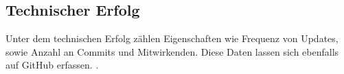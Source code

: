 \subsection{Technischer Erfolg}

Unter dem technischen Erfolg zählen Eigenschaften wie Frequenz von Updates,
sowie Anzahl an Commits und Mitwirkenden. Diese Daten lassen sich ebenfalls auf GitHub erfassen.
\cite{midhaFactorsAffectingSuccess2012}. %

